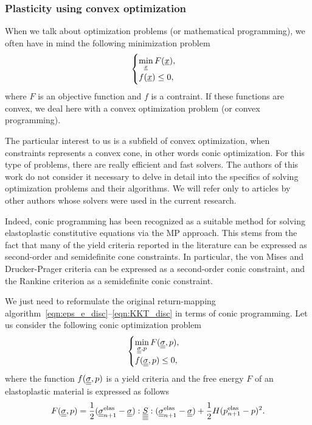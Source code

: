 \documentclass[12pt]{article}
\begin{document}
\subsubsection{Plasticity using convex optimization}

When we talk about optimization problems (or mathematical programming), we often have in mind the following minimization problem
\begin{equation}
    \begin{cases}
        \min\limits_{\underline{x}} F(\underline{x}),\\
        f(\underline{x}) \leq 0,
    \end{cases}
\end{equation}
where $F$ is an objective function and $f$ is a contraint. If these functions are convex, we deal here with a convex optimization problem (or convex programming). 

The particular interest to us is a subfield of convex optimization, when constraints represents a convex cone, in other words conic optimization. For this type of problems, there are really efficient and fast solvers. The authors of this work do not consider it necessary to delve in detail into the specifics of solving optimization problems and their algorithms. We will refer only to articles by other authors whose solvers were used in the current research.

Indeed, conic programming has been recognized as a suitable method for solving elastoplastic constitutive equations via the MP approach. This stems from the fact that many of the yield criteria reported in the literature can be expressed as second-order and semidefinite cone constraints. In particular, the von Mises and Drucker-Prager criteria can be expressed as a second-order conic constraint, and the Rankine criterion as a semidefinite conic constraint. 

We just need to reformulate the original return-mapping algorithm~\ref{eqn:eps_e_disc}--\ref{eqn:KKT_disc} in terms of conic programming. Let us consider the following conic optimization problem
\begin{equation}
    \label{eqn:conic_problem}
    \begin{cases}
        \min\limits_{\underline{\underline{\sigma}}, p} F(\underline{\underline{\sigma}}, p), \\
        f(\underline{\underline{\sigma}}, p) \leq 0,
    \end{cases}
\end{equation}
where the function $f(\underline{\underline{\sigma}}, p)$ is a yield criteria and the free energy $F$ of an elastoplastic material is expressed as follows
\begin{equation}
    F(\underline{\underline{\sigma}}, p) = \frac{1}{2}(\underline{\underline{\sigma}}_{n+1}^{\text{elas}} - \underline{\underline{\sigma}}) : \underline{\underline{\underline{\underline{S}}}} : (\underline{\underline{\sigma}}_{n+1}^{\text{elas}} - \underline{\underline{\sigma}}) + \frac{1}{2}H(p_{n+1}^\text{elas} - p)^2.
\end{equation}
\end{document}
